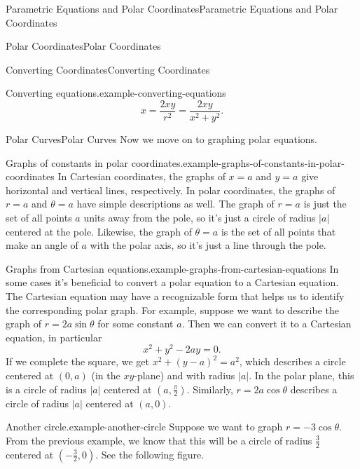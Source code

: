 \documentclass[10pt,]{book}
\numberwithin{equation}{section}
\begin{document}
\begin{chapterptx}{Parametric Equations and Polar Coordinates}{}{Parametric Equations and Polar Coordinates}{}{}
\begin{sectionptx}{Polar Coordinates}{}{Polar Coordinates}{}{}
\begin{subsectionptx}{Converting Coordinates}{}{Converting Coordinates}{}{}
\begin{example}{Converting equations.}{example-converting-equations}
\begin{equation*}
x = \frac{2xy}{r^{2}} = \frac{2xy}{x^{2}+y^{2}}.
\end{equation*}
\end{example}
\end{subsectionptx}
%
%
\typeout{************************************************}
\typeout{************************************************}
%
\begin{subsectionptx}{Polar Curves}{}{Polar Curves}{}{}\label{subsection-polar-curves}
\hypertarget{p-810}{}%
Now we move on to graphing polar equations.%
\begin{example}{Graphs of constants in polar coordinates.}{example-graphs-of-constants-in-polar-coordinates}%
\hypertarget{p-811}{}%
In Cartesian coordinates, the graphs of \(x=a\) and \(y=a\) give horizontal and vertical lines, respectively. In polar coordinates, the graphs of \(r=a\) and \(\theta=a\) have simple descriptions as well. The graph of \(r=a\) is just the set of all points \(a\) units away from the pole, so it's just a circle of radius \(|a|\) centered at the pole. Likewise, the graph of \(\theta = a\) is the set of all points that make an angle of \(a\) with the polar axis, so it's just a line through the pole.%
\end{example}
\begin{example}{Graphs from Cartesian equations.}{example-graphs-from-cartesian-equations}%
\hypertarget{p-812}{}%
In some cases it's beneficial to convert a polar equation to a Cartesian equation. The Cartesian equation may have a recognizable form that helps us to identify the corresponding polar graph. For example, suppose we want to describe the graph of \(r = 2a\sin\theta\) for some constant \(a\). Then we can convert it to a Cartesian equation, in particular%
%
\begin{equation*}
x^{2}+y^{2} - 2ay = 0.
\end{equation*}
\hypertarget{p-813}{}%
If we complete the square, we get \(x^{2}+(y-a)^{2} = a^{2}\), which describes a circle centered at \((0,a)\) (in the \(xy\)-plane) and with radius \(|a|\). In the polar plane, this is a circle of radius \(|a|\) centered at \((a,\frac{\pi}{2}).\) Similarly, \(r=2a\cos\theta\) describes a circle of radius \(|a|\) centered at \((a,0)\).%
\end{example}
\begin{example}{Another circle.}{example-another-circle}%
\hypertarget{p-814}{}%
Suppose we want to graph \(r=-3\cos\theta\). From the previous example, we know that this will be a circle of radius \(\frac{3}{2}\) centered at \((-\frac{3}{2},0)\). See the following figure.%

\end{example}
\end{subsectionptx}
\end{sectionptx}
\end{chapterptx}
\end{document}

